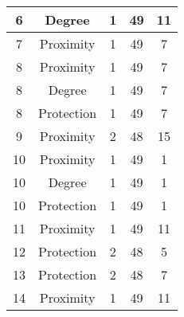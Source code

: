 \documentclass[results.tex]{subfiles}
\begin{document}
\begin{center}
\begin{tabular}{| c || c | c | c | c |}
            \hline
            6                       & Degree                       & 1                      & 49                      & 11                   \\
            \hline
            7                       & Proximity                    & 1                      & 49                      & 7                    \\
            \hline
            8                       & Proximity                    & 1                      & 49                      & 7                    \\
            \hline
            8                       & Degree                       & 1                      & 49                      & 7                    \\
            \hline
            8                       & Protection                   & 1                      & 49                      & 7                    \\
            \hline
            9                       & Proximity                    & 2                      & 48                      & 15                   \\
            \hline
            10                      & Proximity                    & 1                      & 49                      & 1                    \\
            \hline
            10                      & Degree                       & 1                      & 49                      & 1                    \\
            \hline
            10                      & Protection                   & 1                      & 49                      & 1                    \\
            \hline
            11                      & Proximity                    & 1                      & 49                      & 11                   \\
            \hline
            12                      & Protection                   & 2                      & 48                      & 5                    \\
            \hline
            13                      & Protection                   & 2                      & 48                      & 7                    \\
            \hline
            14                      & Proximity                    & 1                      & 49                      & 11                   \\

\end{tabular}
\end{center}
\end{document}
